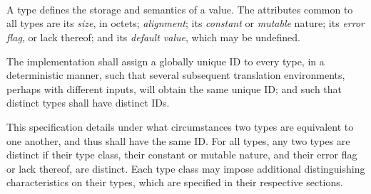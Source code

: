 
\begin{grammar}

 \\
	 \optional{\terminal{!}}  \\

 \\
	 \\
	 \\
	 \\
	 \\
	 \\
	 \\
	 \\
	 \\
	 \\

 \\
	 \\
	 \\
	 \\
	 \\
	 \\
	 \\
	 \\
\end{grammar}

\specsubitem
A type defines the storage and semantics of a value. The attributes common to
all types are its \textit{size}, in octets; \textit{alignment}; its
\textit{constant} or \textit{mutable} nature; its \textit{error flag}, or lack
thereof; and its \textit{default value}, which may be undefined.

\specsubitem
The implementation shall assign a globally unique ID to every type, in a
deterministic manner, such that several subsequent translation environments,
perhaps with different inputs, will obtain the same unique ID; and such that
distinct types shall have distinct IDs.

This specification details under what circumstances two types are equivalent to
one another, and thus shall have the same ID. For all types, any two types are
distinct if their type class, their constant or mutable nature, and their error
flag or lack thereof, are distinct. Each type class may impose additional
distinguishing characteristics on their types, which are specified in their
respective sections.

